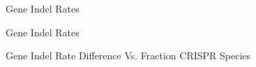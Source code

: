 \documentclass[dvipsnames]{beamer}
\begin{document}
\begin{frame}[fragile]{Gene Indel Rates}
    \begin{figure}[htb!]
    \end{figure}
\end{frame}
\begin{frame}[fragile]{Gene Indel Rates}
    \begin{figure}[htb!]
    \end{figure}
\end{frame}
\begin{frame}[fragile]{Gene Indel Rate Difference Vs. Fraction CRISPR Species}
    \begin{figure}[htb!]
    \end{figure}
\end{frame}
\end{document}
